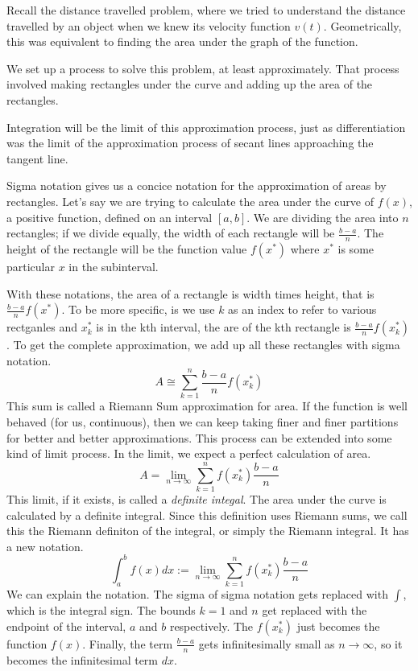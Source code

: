 \documentclass[fleqn]{report}
\begin{document}
Recall the distance travelled problem, where we tried to
understand the distance travelled by an object when we knew
its velocity function $v(t)$. Geometrically, this was
equivalent to finding the area under the graph of the
function.

We set up a process to solve this problem, at
least approximately. That process involved making rectangles
under the curve and adding up the area of the rectangles.

Integration will be the limit of this approximation process,
just as differentiation was the limit of the approximation
process of secant lines approaching the tangent line. 

Sigma notation gives us a concice notation for the
approximation of areas by rectangles. Let's say we are trying
to calculate the area under the curve of $f(x)$, a positive
function, defined on an interval $[a,b]$. We are
dividing the area into $n$ rectangles; if we divide equally,
the width of each rectangle will be $\frac{b-a}{n}$. The
height of the rectangle will be the function value $f(x^*)$
where $x^*$ is some particular $x$ in the subinterval.

With these notations, the area of a rectangle is width times
height, that is $\frac{b-a}{n} f(x^*)$. To be more specific,
is we use $k$ as an index to refer to various rectganles and
$x_k^*$ is in the kth interval, the are of the kth rectangle
is $\frac{b-a}{n} f(x_k^*)$. To get the complete
approximation, we add up all these rectangles with sigma
notation.
\begin{equation*}
A \cong \sum_{k=1}^n \frac{b-a}{n} f(x_k^*)
\end{equation*}
This sum is called a Riemann Sum approximation for area.
If the function is well behaved (for us, continuous), then
we can keep taking finer and finer partitions for better and
better approximations. This process can be extended into some
kind of limit process. In the limit, we expect a perfect
calculation of area.
\begin{equation*}
A = \lim_{n \rightarrow \infty} \sum_{k=1}^n
f(x_k^*) \frac{b-a}{n}
\end{equation*}
This limit, if it exists, is called a \emph{definite integal}.
The area under the curve is calculated by a definite integral.
Since this definition uses Riemann sums, we call this the
Riemann definiton of the integral, or simply the Riemann
integral. It has a new notation.
\begin{equation*}
\int_a^b f(x) dx := \lim_{n \rightarrow \infty} \sum_{k=1}^n
f(x_k^*) \frac{b-a}{n}
\end{equation*}
We can explain the notation. The sigma of sigma
notation gets replaced with $\int$, which is the integral
sign. The bounds $k=1$ and $n$ get replaced with the endpoint
of the interval, $a$ and $b$ respectively. The $f(x^*_k)$
just becomes the function $f(x)$. Finally, the term
$\frac{b-a}{n}$ gets infinitesimally small as $n \rightarrow
\infty$, so it becomes the infinitesimal term $dx$.
\end{document}
